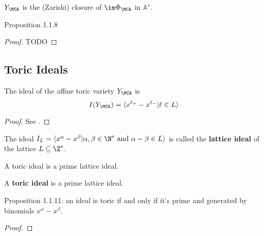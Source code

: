 \begin{definition}
  \label{1-1-7-ya}

  $Y_\MCA$ is the (Zariski) closure of $\im \Phi_\MCA$ in $\mathbb A^s$.
\end{definition}


\begin{proposition}
  \label{1-1-8-aff-tor-var-ya}

  Proposition 1.1.8
\end{proposition}
\begin{proof}

  TODO
\end{proof}


\subsection{Toric Ideals}


\begin{proposition}
  \label{1-1-9-ideal-ya}

  The ideal of the affine toric variety $Y_\MCA$ is
  \[
    I(Y_\MCA) = \langle x^{\ell_+} - x^{\ell_-} | \ell \in L\rangle
  \]
\end{proposition}
\begin{proof}
  \uses{}

  See \cite{Cox_2011}.
\end{proof}


\begin{definition}
  \label{1-1-10-lattice-ideal}
  \uses{}
  \leanok

  The ideal $I_L = \langle x^\alpha - x^\beta | \alpha, \beta \in \N^s \text{ and } \alpha - \beta \in L\rangle$ is called the {\bf lattice ideal} of the lattice $L \subseteq \Z^s$.

  A toric ideal is a prime lattice ideal.
\end{definition}


\begin{definition}
  \label{1-1-10-toric-ideal}
  \leanok
  A {\bf toric ideal} is a prime lattice ideal.
\end{definition}


\begin{proposition}
  \label{1-1-11-toric-ideal-gen-binomial}

  Proposition 1.1.11: an ideal is toric if and only if it's prime and generated by binomials $x^\alpha - x^\beta$.
\end{proposition}
\begin{proof}

\end{proof}


